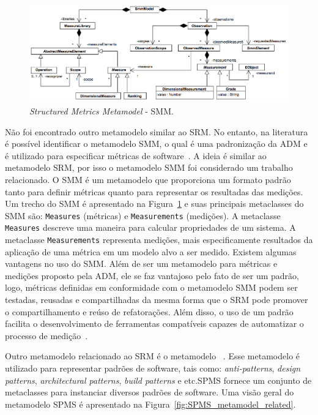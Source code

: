 \begin{figure}[h]
	\centering
	\caption{\textit{Structured Metrics Metamodel} - SMM.}
	\label{fig:SMM_metamodel_related}
	\includegraphics[scale=0.45]{images/SMM_metamodelo_related}
\end{figure}

Não foi encontrado outro metamodelo similar ao SRM. No entanto, na literatura é possível identificar o metamodelo SMM, o qual é uma padronização da ADM e é utilizado para especificar métricas de software~\cite{ADM:SMM}. A ideia é similar ao metamodelo SRM, por isso o metamodelo SMM foi considerado um trabalho relacionado. O SMM é um metamodelo que proporciona um formato padrão tanto para definir métricas quanto para representar os resultadas das medições. Um trecho do SMM é apresentado na Figura~\ref{fig:SMM_metamodel_related} e suas principais metaclasses do SMM são: \texttt{Measures} (métricas) e \texttt{Measurements} (medições). A metaclasse \texttt{Measures} descreve uma maneira para calcular propriedades de um sistema. A metaclasse \texttt{Measurements} representa medições, mais especificamente resultados da aplicação de uma métrica em um modelo alvo a ser medido. Existem algumas vantagens no uso do SMM. Além de ser um metamodelo para métricas e medições proposto pela ADM, ele se faz vantajoso pelo fato de ser um padrão, logo, métricas definidas em conformidade com o metamodelo SMM podem ser testadas, reusadas e compartilhadas da mesma forma que o SRM pode promover o compartilhamento e reúso de refatorações. Além disso, o uso de um padrão facilita o desenvolvimento de ferramentas compatíveis capazes de automatizar o processo de medição~\cite{ADM:SMM}.

Outro metamodelo relacionado ao SRM é o metamodelo ~\cite{ADM:SPMS}. Esse metamodelo é utilizado para representar padrões de software, tais como: \textit{anti-patterns}, \textit{design patterns}, \textit{architectural patterns}, \textit{build patterns} e etc.SPMS fornece um conjunto de metaclasses para instanciar diversos padrões de software. Uma visão geral do metamodelo SPMS é apresentado na Figura~\ref{fig:SPMS_metamodel_related}. 

